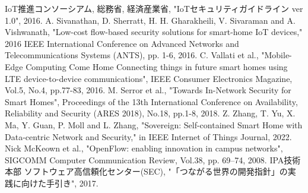 \documentclass[Japanese]{dicomopapers}
\begin{document}
\begin{thebibliography}{10}
	 IoT推進コンソーシアム, 総務省, 経済産業省, "IoTセキュリティガイドライン ver 1.0", 2016.
	 A. Sivanathan, D. Sherratt, H. H. Gharakheili, V. Sivaraman and A. Vishwanath, "Low-cost flow-based security solutions for smart-home IoT devices," 2016 IEEE International Conference on Advanced Networks and Telecommunications Systems (ANTS), pp. 1-6, 2016.
	 C. Vallati et al., "Mobile-Edge Computing Come Home Connecting things in future smart homes using LTE device-to-device communications", IEEE Consumer Electronics Magazine, Vol.5, No.4, pp.77-83, 2016.
	 M. Serror et al., "Towards In-Network Security for Smart Homes", Proceedings of the 13th International Conference on Availability, Reliability and Security (ARES 2018), No.18, pp.1-8, 2018.
	 Z. Zhang, T. Yu, X. Ma, Y. Guan, P. Moll and L. Zhang, "Sovereign: Self-contained Smart Home with Data-centric Network and Security," in IEEE Internet of Things Journal, 2022.
	 Nick McKeown et al., "OpenFlow: enabling innovation in campus networks", SIGCOMM Computer Communication Review, Vol.38, pp. 69–74, 2008.
	 IPA技術本部 ソフトウェア高信頼化センター(SEC), "「つながる世界の開発指針」の実践に向けた手引き", 2017.
\end{thebibliography}
\end{document}

